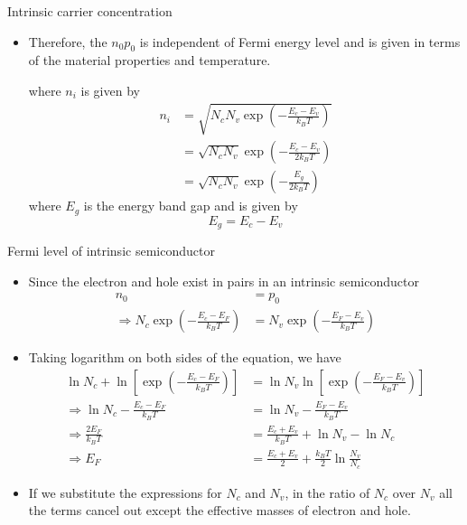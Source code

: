 %
\begin{frame}[label=pre-M2T1-slot1]{Intrinsic carrier concentration}
	\begin{itemize}
		\item Therefore, the \(n_0 p_0\) is independent of Fermi energy level and is given in terms of the material properties and temperature.
		\begin{center}
		\end{center}
		where \(n_i\) is given by
		\begin{align*}
			n_i &= \sqrt{N_c N_v\exp\left(-\frac{E_c-E_v}{k_BT}\right)}	\\
			&= \sqrt{N_c N_v}\exp\left(-\frac{E_c-E_v}{2k_BT}\right)	\\
			&= \sqrt{N_c N_v}\exp\left(-\frac{E_g}{2k_BT}\right)
		\end{align*}
		where \(E_g\) is the energy band gap and is given by
		\[
		E_g = E_c-E_v
		\]
		\begin{center}
		\end{center}
	\end{itemize}
\end{frame}
%
\begin{frame}[label=pre-M2T1-slot1]{Fermi level of intrinsic semiconductor}
\begin{small}
		\begin{itemize}
		\item Since the electron and hole exist in pairs in an intrinsic semiconductor
		\begin{align*}
			n_0 &= p_0	\\
			\Rightarrow N_c \exp\left(-\frac{E_c-E_F}{k_BT}\right) &= N_v \exp\left(-\frac{E_F-E_v}{k_BT}\right)
		\end{align*}
		\item Taking logarithm on both sides of the equation, we have
		\begin{align*}
			\ln N_c + \ln \left[\exp\left(-\frac{E_c-E_F}{k_BT}\right)\right] &= \ln N_v \ln \left[\exp\left(-\frac{E_F-E_v}{k_BT}\right)\right]	\\
			\Rightarrow \ln N_c -\frac{E_c-E_F}{k_BT} &= \ln N_v -\frac{E_F-E_v}{k_BT}	\\
			\Rightarrow \frac{2E_F}{k_BT} &= \frac{E_c+E_v}{k_BT} +  \ln N_v - \ln N_c 	\\
			\Rightarrow E_F &= \frac{E_c+E_v}{2} + \frac{k_BT}{2}\ln \frac{N_v}{N_c}
		\end{align*}
		\item If we substitute the expressions for \(N_c\) and \(N_v\), in the ratio of \(N_c\) over \(N_v\) all the terms cancel out except the effective masses of electron and hole. 
	\end{itemize}
\end{small}
\end{frame}
